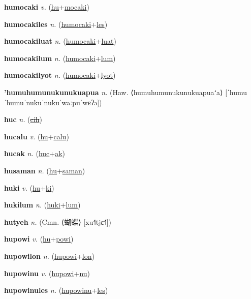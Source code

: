 \textbf{\hypertarget{humocaki}{humocaki}} \textit{v.} (\hyperlink{hu}{hu}+\allowbreak \hyperlink{mocaki}{mocaki})


\textbf{\hypertarget{humocakiles}{humocakiles}} \textit{n.} (\hyperlink{humocaki}{humocaki}+\allowbreak \hyperlink{les}{les})


\textbf{\hypertarget{humocakiluat}{humocakiluat}} \textit{n.} (\hyperlink{humocaki}{humocaki}+\allowbreak \hyperlink{luat}{luat})


\textbf{\hypertarget{humocakilum}{humocakilum}} \textit{n.} (\hyperlink{humocaki}{humocaki}+\allowbreak \hyperlink{lum}{lum})


\textbf{\hypertarget{humocakilyot}{humocakilyot}} \textit{n.} (\hyperlink{humocaki}{humocaki}+\allowbreak \hyperlink{lyot}{lyot})


\textbf{\hypertarget{'humuhumunukunukuapua}{'humuhumunukunukuapua}} \textit{n.} (Haw. ⟨humuhumunukunukuapuaʻa⟩ [ˈhumuˈhumuˈnukuˈnukuˈwaːpuˈwɐʔə])


\textbf{\hypertarget{huc}{huc}} \textit{n.} (\hyperlink{cih}{\sout{cih}})


\textbf{\hypertarget{hucalu}{hucalu}} \textit{v.} (\hyperlink{hu}{hu}+\allowbreak \hyperlink{calu}{calu})


\textbf{\hypertarget{hucak}{hucak}} \textit{n.} (\hyperlink{huc}{huc}+\allowbreak \hyperlink{ak}{ak})


\textbf{\hypertarget{husaman}{husaman}} \textit{n.} (\hyperlink{hu}{hu}+\allowbreak \hyperlink{saman}{saman})


\textbf{\hypertarget{huki}{huki}} \textit{v.} (\hyperlink{hu}{hu}+\allowbreak \hyperlink{ki}{ki})


\textbf{\hypertarget{hukilum}{hukilum}} \textit{n.} (\hyperlink{huki}{huki}+\allowbreak \hyperlink{lum}{lum})


\textbf{\hypertarget{hutyeh}{hutyeh}} \textit{n.} (Cmn. ⟨{\chinese{}蝴蝶}⟩ [xu˧˥tjɛ˧˥])


\textbf{\hypertarget{hupowi}{hupowi}} \textit{v.} (\hyperlink{hu}{hu}+\allowbreak \hyperlink{powi}{powi})


\textbf{\hypertarget{hupowilon}{hupowilon}} \textit{n.} (\hyperlink{hupowi}{hupowi}+\allowbreak \hyperlink{lon}{lon})


\textbf{\hypertarget{hupowinu}{hupowinu}} \textit{v.} (\hyperlink{hupowi}{hupowi}+\allowbreak \hyperlink{nu}{nu})


\textbf{\hypertarget{hupowinules}{hupowinules}} \textit{n.} (\hyperlink{hupowinu}{hupowinu}+\allowbreak \hyperlink{les}{les})


